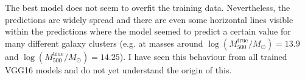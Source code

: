 The best model does not seem to overfit the training data. Nevertheless, the predictions are widely spread and there are even some horizontal lines visible within the predictions where the model seemed to predict a certain value for many different galaxy clusters (e.g. at masses around $\log{(M_{500}^{\text{true}}/M_{\odot})} = 13.9$ and $\log{(M_{500}^{\text{true}}/M_{\odot})} = 14.25$). I have seen this behaviour from all trained VGG16 models and do not yet understand the origin of this.